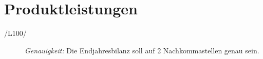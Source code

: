 \section{Produktleistungen}

\begin{description}
  \item[/L100/]
    \textit{Genauigkeit:}
    	Die Endjahresbilanz soll auf 2 Nachkommastellen genau sein.
\end{description}

